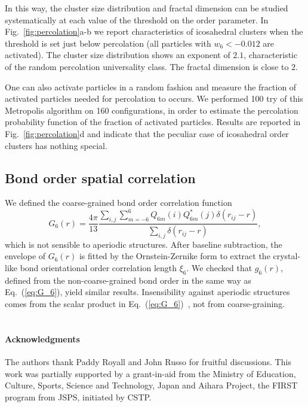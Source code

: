 In this way, the cluster size distribution and fractal dimension can be studied systematically at each value of the threshold on the order parameter. In Fig.~\ref{fig:percolation}a-b we report characteristics of icosahedral clusters when the threshold is set just below percolation (all particles with $w_6<-0.012$ are activated). The cluster size distribution shows an exponent of $2.1$, characteristic of the random percolation universality class. The fractal dimension is close to $2$.

One can also activate particles in a random fashion and measure the fraction of activated particles needed for percolation to occurs. We performed 100 try of this Metropolis algorithm on 160 configurations, in order to estimate the percolation probability function of the fraction of activated particles. Results are reported in Fig.~\ref{fig:percolation}d and indicate that the peculiar case of icosahedral order clusters has nothing special.

\subsection*{Bond order spatial correlation}

We defined the coarse-grained bond order correlation function
\begin{equation}
	G_6(r) = \frac{4\pi}{13}\frac{\sum_{i,j} \sum_{m=-6}^{6} Q_{6 m}(i) Q_{6 m}^{*}(j) \delta(r_{ij}-r)}{\sum_{i,j} \delta(r_{ij}-r)},
	\label{eq:G_6}
\end{equation}
which is not sensible to aperiodic structures. After baseline subtraction, the envelope of $G_6(r)$ is fitted by the Ornstein-Zernike form to extract the crystal-like bond orientational order correlation length $\xi_6$. We checked that $g_6(r)$, defined from the non-coarse-grained bond order in the same way as Eq.~(\ref{eq:G_6}), yield similar results. Insensibility against aperiodic structures comes from the scalar product in Eq.~(\ref{eq:G_6})~\cite{Tomida1995}, not from coarse-graining.

%



\section*{}
\paragraph*{\bf Acknowledgments}
The authors thank Paddy Royall and John Russo for fruitful discussions. 
This work was partially supported by a grant-in-aid from the 
Ministry of Education, Culture, Sports, Science and Technology, Japan and 
Aihara Project, the FIRST program from JSPS, initiated by CSTP. 

